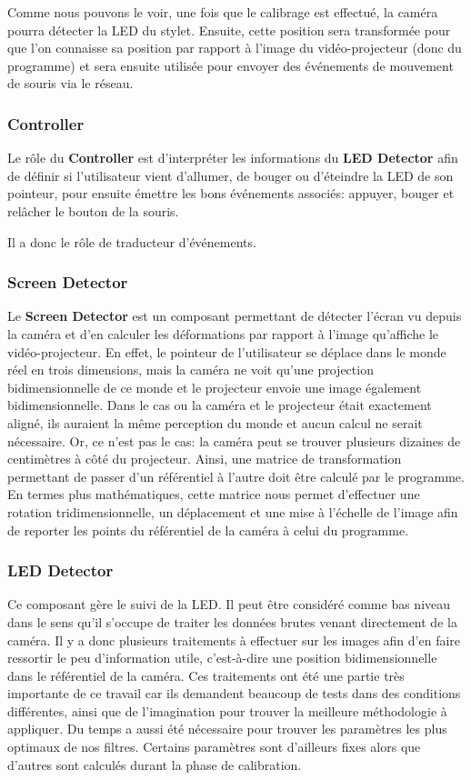 \documentclass[11pt,a4paper,oldfontcommands]{memoir}
\begin{document}
Comme nous pouvons le voir, une fois que le calibrage est effectué, la caméra pourra détecter la LED du stylet. Ensuite, cette position sera transformée pour que l'on connaisse sa position par rapport à l'image du vidéo-projecteur (donc du programme) et sera ensuite utilisée pour envoyer des événements de mouvement de souris via le réseau.

\subsubsection{Controller}

Le rôle du \textbf{Controller} est d'interpréter les informations du \textbf{LED Detector} afin de définir si l'utilisateur vient d'allumer, de bouger ou d'éteindre la LED de son pointeur, pour ensuite émettre les bons événements associés: appuyer, bouger et relâcher le bouton de la souris.

Il a donc le rôle de traducteur d'événements.

\subsubsection{Screen Detector}

Le \textbf{Screen Detector} est un composant permettant de détecter l'écran vu depuis la caméra et d'en calculer les déformations par rapport à l'image qu'affiche le vidéo-projecteur. En effet, le pointeur de l'utilisateur se déplace dans le monde réel en trois dimensions, mais la caméra ne voit qu'une projection bidimensionnelle de ce monde et le projecteur envoie une image également bidimensionnelle. Dans le cas ou la caméra et le projecteur était exactement aligné, ils auraient la même perception du monde et aucun calcul ne serait nécessaire. Or, ce n'est pas le cas: la caméra peut se trouver plusieurs dizaines de centimètres à côté du projecteur. Ainsi, une matrice de transformation permettant de passer d'un référentiel à l'autre doit être calculé par le programme. En termes plus mathématiques, cette matrice nous permet d'effectuer une rotation tridimensionnelle, un déplacement et une mise à l'échelle de l'image afin de reporter les points du référentiel de la caméra à celui du programme.

\subsubsection{LED Detector}

Ce composant gère le suivi de la LED. Il peut être considéré comme bas niveau dans le sens qu'il s'occupe de traiter les données brutes venant directement de la caméra. Il y a donc plusieurs traitements à effectuer sur les images afin d'en faire ressortir le peu d'information utile, c'est-à-dire une position bidimensionnelle dans le référentiel de la caméra. Ces traitements ont été une partie très importante de ce travail car ils demandent beaucoup de tests dans des conditions différentes, ainsi que de l'imagination pour trouver la meilleure méthodologie à appliquer. Du temps a aussi été nécessaire pour trouver les paramètres les plus optimaux de nos filtres. Certains paramètres sont d'ailleurs fixes alors que d'autres sont calculés durant la phase de calibration.
\end{document}
